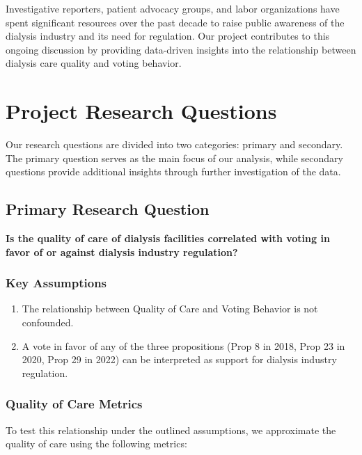 \documentclass[
  11pt,
  letterpaper,
  DIV=11,
  numbers=noendperiod]{scrartcl}
\providecommand{\tightlist}{%
  \setlength{\itemsep}{0pt}\setlength{\parskip}{0pt}}\usepackage{longtable,booktabs,array}
\begin{document}
Investigative reporters, patient advocacy groups, and labor
organizations have spent significant resources over the past decade to
raise public awareness of the dialysis industry and its need for
regulation. Our project contributes to this ongoing discussion by
providing data-driven insights into the relationship between dialysis
care quality and voting behavior.

\section{Project Research Questions}\label{project-research-questions}

Our research questions are divided into two categories: primary and
secondary. The primary question serves as the main focus of our
analysis, while secondary questions provide additional insights through
further investigation of the data.

\subsection{Primary Research Question}\label{primary-research-question}

\textbf{Is the quality of care of dialysis facilities correlated with
voting in favor of or against dialysis industry regulation?}

\subsubsection{Key Assumptions}\label{key-assumptions}

\begin{enumerate}
\def\labelenumi{\arabic{enumi}.}
\tightlist
\item
  The relationship between Quality of Care and Voting Behavior is not
  confounded.
\item
  A vote in favor of any of the three propositions (Prop 8 in 2018, Prop
  23 in 2020, Prop 29 in 2022) can be interpreted as support for
  dialysis industry regulation.
\end{enumerate}

\subsubsection{Quality of Care Metrics}\label{quality-of-care-metrics}

To test this relationship under the outlined assumptions, we approximate
the quality of care using the following metrics:
\end{document}
